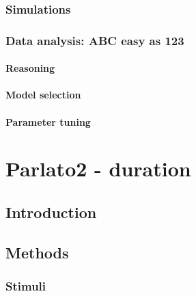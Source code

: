\subsubsection{Simulations}
\subsubsection{Data analysis: ABC easy as 123}
\paragraph{Reasoning}
\paragraph{Model selection}
\paragraph{Parameter tuning}


\section{{\color{red}Parlato2 - duration}}
\subsection{Introduction}
\subsection{Methods}
\subsubsection{Stimuli}

